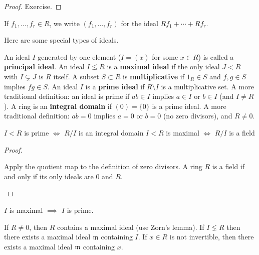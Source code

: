 \begin{proof}
	Exercise.
\end{proof}

\begin{note}
	If $f_1,\ldots,f_r \in R$, we write $(f_1,\ldots,f_r)$ for the ideal
	$Rf_1+\cdots+Rf_r$.
\end{note}

\begin{defn}
	Here are some special types of ideals.
	\begin{enum}
		\io An ideal $I$ generated by one element ($I=(x)$ for some $x \in R$) is called a \textbf{principal ideal}.
		\io An ideal $I \lneq R$ is a \textbf{maximal ideal} if the only ideal $J<R$ with $I \subsetneq J$ is $R$ itself.
		\io A subset $S \subset R$ is \textbf{multiplicative} if $1_R \in S$ and $f,g \in S$ implies $fg \in S$.
		\io An ideal $I$ is a \textbf{prime ideal} if $R \setminus I$ is a multiplicative set.
		A more traditional definition: an ideal is prime if $ab \in I$ implies $a \in I$ or $b \in I$ (and $I \neq R$).
		\io A ring is an \textbf{integral domain} if $(0)=\{0\}$ is a prime ideal.
		A more traditional definition: $ab=0$ implies $a=0$ or $b=0$ (no zero divisors), and $R \neq 0$.
	\end{enum}
\end{defn}

\begin{prop}
	\begin{enum}
		\io $I<R$ is prime $\iff$ $R/I$ is an integral domain
		\io $I<R$ is maximal $\iff$ $R/I$ is a field
	\end{enum}
\end{prop}

\begin{proof}
	\begin{enum}
		\io Apply the quotient map to the definition of zero divisors.
		\io A ring $R$ is a field if and only if its only ideals are $0$ and $R$. \qedhere
	\end{enum}
\end{proof}

\begin{cor}
	$I$ is maximal $\implies$ $I$ is prime.
\end{cor}

\begin{exer}
	\begin{enum}
		\io If $R \neq 0$, then $R$ contains a maximal ideal (use Zorn's lemma).
		\io If $I\lneq R$ then there exists a maximal ideal $\mathfrak{m}$ containing $I$.
		\io If $x \in R$ is not invertible, then there exists a maximal ideal $\mathfrak{m}$ containing $x$.
	\end{enum}
\end{exer}

